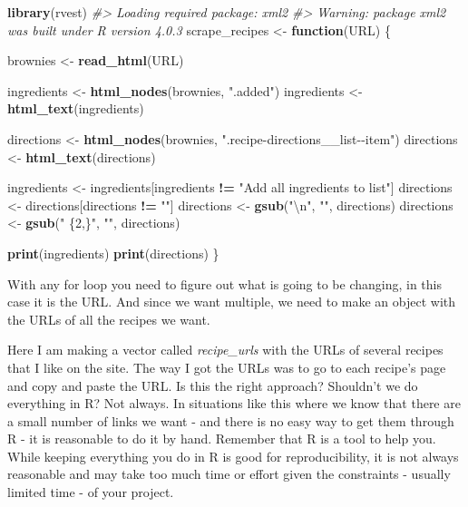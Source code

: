 \documentclass[
  12pt,
]{book}
\newenvironment{Shaded}{\begin{snugshade}}{\end{snugshade}}
\newcommand{\CharTok}[1]{\textcolor[rgb]{0.5,0.5,0.5}{#1}}
\newcommand{\CommentTok}[1]{\textcolor[rgb]{0.37,0.37,0.37}{\textit{#1}}}
\newcommand{\ControlFlowTok}[1]{\textcolor[rgb]{0.27,0.27,0.27}{\textbf{#1}}}
\newcommand{\KeywordTok}[1]{\textcolor[rgb]{0.27,0.27,0.27}{\textbf{#1}}}
\newcommand{\NormalTok}[1]{#1}
\newcommand{\OperatorTok}[1]{\textcolor[rgb]{0.43,0.43,0.43}{\textbf{#1}}}
\newcommand{\StringTok}[1]{\textcolor[rgb]{0.5,0.5,0.5}{#1}}
\begin{document}
\begin{Shaded}
\begin{Highlighting}[]
\KeywordTok{library}\NormalTok{(rvest)}
\CommentTok{\#\textgreater{} Loading required package: xml2}
\CommentTok{\#\textgreater{} Warning: package \textquotesingle{}xml2\textquotesingle{} was built under R version 4.0.3}
\NormalTok{scrape\_recipes \textless{}{-}}\StringTok{ }\ControlFlowTok{function}\NormalTok{(URL) \{}
  
\NormalTok{  brownies \textless{}{-}}\StringTok{ }\KeywordTok{read\_html}\NormalTok{(URL)}
  
\NormalTok{  ingredients \textless{}{-}}\StringTok{ }\KeywordTok{html\_nodes}\NormalTok{(brownies, }\StringTok{".added"}\NormalTok{)}
\NormalTok{  ingredients \textless{}{-}}\StringTok{ }\KeywordTok{html\_text}\NormalTok{(ingredients)}
  
\NormalTok{  directions \textless{}{-}}\StringTok{ }\KeywordTok{html\_nodes}\NormalTok{(brownies, }\StringTok{".recipe{-}directions\_\_list{-}{-}item"}\NormalTok{)}
\NormalTok{  directions \textless{}{-}}\StringTok{ }\KeywordTok{html\_text}\NormalTok{(directions)}
  
\NormalTok{  ingredients \textless{}{-}}\StringTok{ }\NormalTok{ingredients[ingredients }\OperatorTok{!=}\StringTok{ "Add all ingredients to list"}\NormalTok{]}
\NormalTok{  directions  \textless{}{-}}\StringTok{ }\NormalTok{directions[directions }\OperatorTok{!=}\StringTok{ ""}\NormalTok{]}
\NormalTok{  directions  \textless{}{-}}\StringTok{ }\KeywordTok{gsub}\NormalTok{(}\StringTok{"}\CharTok{\textbackslash{}n}\StringTok{"}\NormalTok{, }\StringTok{""}\NormalTok{, directions)}
\NormalTok{  directions  \textless{}{-}}\StringTok{ }\KeywordTok{gsub}\NormalTok{(}\StringTok{" \{2,\}"}\NormalTok{, }\StringTok{""}\NormalTok{, directions)}
  
  \KeywordTok{print}\NormalTok{(ingredients)}
  \KeywordTok{print}\NormalTok{(directions)}
\NormalTok{\}}
\end{Highlighting}
\end{Shaded}

With any for loop you need to figure out what is going to be changing, in this case it is the URL. And since we want multiple, we need to make an object with the URLs of all the recipes we want.

Here I am making a vector called \emph{recipe\_urls} with the URLs of several recipes that I like on the site. The way I got the URLs was to go to each recipe's page and copy and paste the URL. Is this the right approach? Shouldn't we do everything in R? Not always. In situations like this where we know that there are a small number of links we want - and there is no easy way to get them through R - it is reasonable to do it by hand. Remember that R is a tool to help you. While keeping everything you do in R is good for reproducibility, it is not always reasonable and may take too much time or effort given the constraints - usually limited time - of your project.
\end{document}
